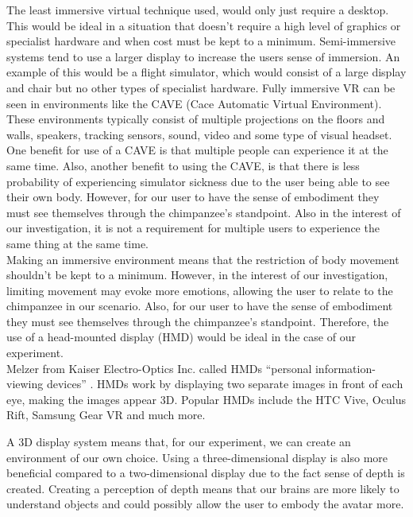 \documentclass[12pt]{report}
\begin{document}
The least immersive virtual technique used, would only just require a desktop. This would be ideal in a situation that doesn’t require a high level of graphics or specialist hardware and when cost must be kept to a minimum. Semi-immersive systems tend to use a larger display to increase the users sense of immersion. An example of this would be a flight simulator, which would consist of a large display and chair but no other types of specialist hardware.  Fully immersive VR can be seen in environments like the CAVE (Cace Automatic Virtual Environment). These environments typically consist of multiple projections on the floors and walls, speakers, tracking sensors, sound, video and some type of visual headset.  One benefit for use of a CAVE is that multiple people can experience it at the same time. Also, another benefit to using the CAVE, is that there is less probability of experiencing simulator sickness due to the user being able to see their own body. However, for our user to have the sense of embodiment they must see themselves through the chimpanzee’s standpoint. Also in the interest of our investigation, it is not a requirement for multiple users to experience the same thing at the same time.
\\

Making an immersive environment means that the restriction of body movement shouldn’t be kept to a minimum. However, in the interest of our investigation, limiting movement may evoke more emotions, allowing the user to relate to the chimpanzee in our scenario. Also, for our user to have the sense of embodiment they must see themselves through the chimpanzee’s standpoint. Therefore, the use of a head-mounted display (HMD) would be ideal in the case of our experiment. 
\\

Melzer from Kaiser Electro-Optics Inc. called HMDs “personal information-viewing devices” . HMDs work by displaying two separate images in front of each eye, making the images appear 3D. Popular HMDs include the HTC Vive, Oculus Rift, Samsung Gear VR and much more. 

A 3D display system means that, for our experiment, we can create an environment of our own choice.  Using a three-dimensional display is also more beneficial compared to a two-dimensional display due to the fact sense of depth is created. Creating a perception of depth means that our brains are more likely to understand objects and could possibly allow the user to embody the avatar more. 
\\
\end{document}
